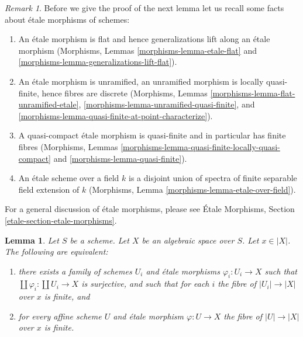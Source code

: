 \documentclass{stacks-project}
\theoremstyle{plain}
\newtheorem{lemma}[subsection]{Lemma}
\theoremstyle{definition}
\theoremstyle{remark}
\newtheorem{remark}[subsection]{Remark}
\numberwithin{equation}{subsection}
\begin{document}
\begin{remark}
\label{remark-recall}
Before we give the proof of the next lemma let us recall some facts
about \'etale morphisms of schemes:
\begin{enumerate}
\item An \'etale morphism is flat and hence generalizations lift along
an \'etale morphism
(Morphisms, Lemmas \ref{morphisms-lemma-etale-flat}
and \ref{morphisms-lemma-generalizations-lift-flat}).
\item An \'etale morphism is unramified, an unramified morphism is locally
quasi-finite, hence fibres are discrete
(Morphisms, Lemmas \ref{morphisms-lemma-flat-unramified-etale},
\ref{morphisms-lemma-unramified-quasi-finite}, and
\ref{morphisms-lemma-quasi-finite-at-point-characterize}).
\item A quasi-compact \'etale morphism is quasi-finite and in particular
has finite fibres
(Morphisms, Lemmas \ref{morphisms-lemma-quasi-finite-locally-quasi-compact} and
\ref{morphisms-lemma-quasi-finite}).
\item An \'etale scheme over a field $k$ is a disjoint union of spectra
of finite separable field extension of $k$
(Morphisms, Lemma \ref{morphisms-lemma-etale-over-field}).
\end{enumerate}
For a general discussion of \'etale morphisms, please see
\'Etale Morphisms, Section \ref{etale-section-etale-morphisms}.
\end{remark}

\begin{lemma}
\label{lemma-U-finite-above-x}
Let $S$ be a scheme. Let $X$ be an algebraic space over $S$.
Let $x \in |X|$. The following are equivalent:
\begin{enumerate}
\item there exists a family of schemes $U_i$ and
\'etale morphisms $\varphi_i : U_i \to X$ such that
$\coprod \varphi_i : \coprod U_i \to X$ is surjective,
and such that for each $i$ the fibre of
$|U_i| \to |X|$ over $x$ is finite, and
\item for every affine scheme $U$ and \'etale morphism $\varphi : U \to X$
the fibre of $|U| \to |X|$ over $x$ is finite.
\end{enumerate}
\end{lemma}
\end{document}
